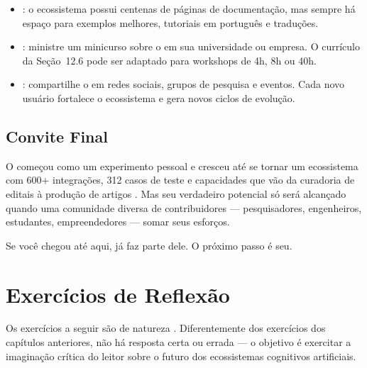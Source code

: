 \begin{itemize}
    \item {}: o ecossistema possui centenas de
    páginas de documentação, mas sempre há espaço para exemplos
    melhores, tutoriais em português e traduções.

    \item {}: ministre um minicurso sobre o
    \opencodeeco{} em sua universidade ou empresa. O currículo
    da Seção~12.6 pode ser adaptado para workshops de 4h, 8h ou
    40h.

    \item {}: compartilhe o \opencodeeco{} em
    redes sociais, grupos de pesquisa e eventos. Cada novo usuário
    fortalece o ecossistema e gera novos ciclos de evolução.
\end{itemize}

\subsection{Convite Final}

O \opencodeeco{} começou como um experimento pessoal e cresceu até
se tornar um ecossistema com 600+ integrações, 312 casos de teste e
capacidades que vão da curadoria de editais à produção de artigos
\qualisA{}. Mas seu verdadeiro potencial só será alcançado quando
uma comunidade diversa de contribuidores --- pesquisadores,
engenheiros, estudantes, empreendedores --- somar seus esforços.

 Se
você chegou até aqui, já faz parte dele. O próximo passo é seu.

\section{Exercícios de Reflexão}
\label{sec:exercicios-reflexao}

Os exercícios a seguir são de natureza . Diferentemente dos exercícios dos capítulos anteriores,
não há resposta certa ou errada --- o objetivo é exercitar a
imaginação crítica do leitor sobre o futuro dos ecossistemas
cognitivos artificiais.


